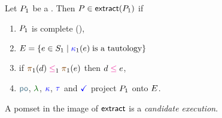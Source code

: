 \begin{definition}

  Let $P_1$ be a \PwTpo{}. Then $\aPS\in\fextract{\aPS_1}$ if 
  \begin{multicols}{2}
    \begin{enumerate}
    \item
      $P_1$ is complete (),
    \item 
      \begin{math}
        E = \{e\in S_1\mid\allowbreak {\color{blue}\kappa}_1(e)
        \;\text{is a tautology} \}
      \end{math}
    \item
      if $\fmrg[1]{\bEv}\le_1 \fmrg[1]{\aEv}$
      then $\bEv\le\aEv$,
    \item $\rpox$, $\labeling$, ${\color{blue}\kappa}$, $\aTr{}{}$ and $\aTerm$ project $P_1$ onto
      $E$.
    \end{enumerate}
  \end{multicols}
\end{definition}
A pomset in the image of $\fextract{}$ is a \emph{candidate execution}.

